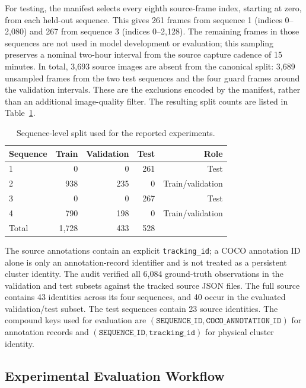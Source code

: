 \documentclass[11pt,a4paper]{article}
\begin{document}
For testing, the manifest selects every eighth source-frame index, starting at zero, from each held-out sequence. This gives 261 frames from sequence 1 (indices 0--2,080) and 267 from sequence 3 (indices 0--2,128). The remaining frames in those sequences are not used in model development or evaluation; this sampling preserves a nominal two-hour interval from the source capture cadence of 15 minutes. In total, 3,693 source images are absent from the canonical split: 3,689 unsampled frames from the two test sequences and the four guard frames around the validation intervals. These are the exclusions encoded by the manifest, rather than an additional image-quality filter. The resulting split counts are listed in Table~\ref{tab:split}.

\begin{table}[!htbp]
\centering\small
\caption{Sequence-level split used for the reported experiments.}
\label{tab:split}
\begin{tabular}{lrrrr}
\toprule
Sequence & Train & Validation & Test & Role \\
\midrule
1 & 0 & 0 & 261 & Test \\
2 & 938 & 235 & 0 & Train/validation \\
3 & 0 & 0 & 267 & Test \\
4 & 790 & 198 & 0 & Train/validation \\
\midrule
Total & 1,728 & 433 & 528 & \\
\bottomrule
\end{tabular}
\end{table}

The source annotations contain an explicit \texttt{tracking\_id}; a COCO annotation ID alone is only an annotation-record identifier and is not treated as a persistent cluster identity. The audit verified all 6,084 ground-truth observations in the validation and test subsets against the tracked source JSON files. The full source contains 43 identities across its four sequences, and 40 occur in the evaluated validation/test subset. The test sequences contain 23 source identities. The compound keys used for evaluation are $(\texttt{SEQUENCE\_ID},\texttt{COCO\_ANNOTATION\_ID})$ for annotation records and $(\texttt{SEQUENCE\_ID},\texttt{tracking\_id})$ for physical cluster identity.

\subsection{Experimental Evaluation Workflow}
\end{document}

